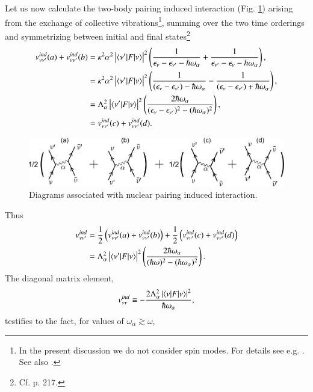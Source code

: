 Let us now calculate the two-body pairing induced interaction (Fig. \ref{fig3.A.2}) arising from the exchange of collective vibrations\footnote{In the present discussion we do not consider spin modes. For details see e.g. \cite{Idini:15}. See also \cite{Bortignon:83}.},  summing over the two time orderings and symmetrizing between initial and final states\footnote{Cf. \cite{Brink:05} p. 217.}
\begin{align}
\nonumber v_{\nu\nu'}^{ind}(a)+v_{\nu\nu'}^{ind}(b)&=\kappa^2\alpha^2\left|\langle {\nu'|F|\nu} \rangle\right|^2\left(\frac{1}{\epsilon_\nu-\epsilon_{\nu'}-\hbar\omega_\alpha}+\frac{1}{\epsilon_{\nu'}-\epsilon_{\nu}-\hbar\omega_\alpha}\right),\\
\nonumber &=\kappa^2\alpha^2\left|\langle {\nu'|F|\nu} \rangle\right|^2\left(\frac{1}{(\epsilon_\nu-\epsilon_{\nu'})-\hbar\omega_\alpha}-\frac{1}{(\epsilon_{\nu}-\epsilon_{\nu'})+\hbar\omega_\alpha}\right),\\
\nonumber &=\Lambda_\alpha^2\left|\langle {\nu'|F|\nu} \rangle\right|^2\left(\frac{2\hbar\omega_\alpha}{(\epsilon_\nu-\epsilon_{\nu'})^2-(\hbar\omega_\alpha)^2}\right),\\
&=v_{\nu\nu'}^{ind}(c)+v_{\nu\nu'}^{ind}(d).
\end{align}
   \begin{figure}
   \centerline{\includegraphics*[width=12cm,angle=0	]{nutshell/figs/fig3_A_2}}
   \caption{Diagrams associated with nuclear pairing induced interaction.}\label{fig3.A.2}
   \end{figure}
Thus
\begin{align}\label{eq3.A.17}
\nonumber v_{\nu\nu'}^{ind}&=\frac{1}{2}\left(v_{\nu\nu'}^{ind}(a)+v_{\nu\nu'}^{ind}(b)\right)+\frac{1}{2}\left(v_{\nu\nu'}^{ind}(c)+v_{\nu\nu'}^{ind}(d)\right)\\ &=\Lambda_\alpha^2\left|\braket{\nu'|F|\nu}\right|^2\left(\frac{2\hbar\omega_\alpha}{(\hbar\omega)^2-(\hbar\omega_\alpha)^2}\right). \idx{Induced pairing interaction}
\end{align}
The diagonal matrix element,
\begin{align}
\nonumber v_{\nu\nu}^{ind}\equiv-\frac{2\Lambda_\alpha^2\left|\langle {\nu|F|\nu} \rangle\right|^2}{\hbar\omega_\alpha},
\end{align}
testifies to the fact, for values of $\omega_\alpha\gtrsim\omega$, 
